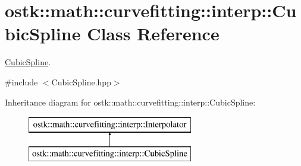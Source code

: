 \hypertarget{classostk_1_1math_1_1curvefitting_1_1interp_1_1_cubic_spline}{}\section{ostk\+:\+:math\+:\+:curvefitting\+:\+:interp\+:\+:Cubic\+Spline Class Reference}
\label{classostk_1_1math_1_1curvefitting_1_1interp_1_1_cubic_spline}


\hyperlink{classostk_1_1math_1_1curvefitting_1_1interp_1_1_cubic_spline}{Cubic\+Spline}.  




{\ttfamily \#include $<$Cubic\+Spline.\+hpp$>$}

Inheritance diagram for ostk\+:\+:math\+:\+:curvefitting\+:\+:interp\+:\+:Cubic\+Spline\+:\begin{figure}[H]
\begin{center}
\leavevmode
\includegraphics[height=2.000000cm]{classostk_1_1math_1_1curvefitting_1_1interp_1_1_cubic_spline}
\end{center}
\end{figure}
